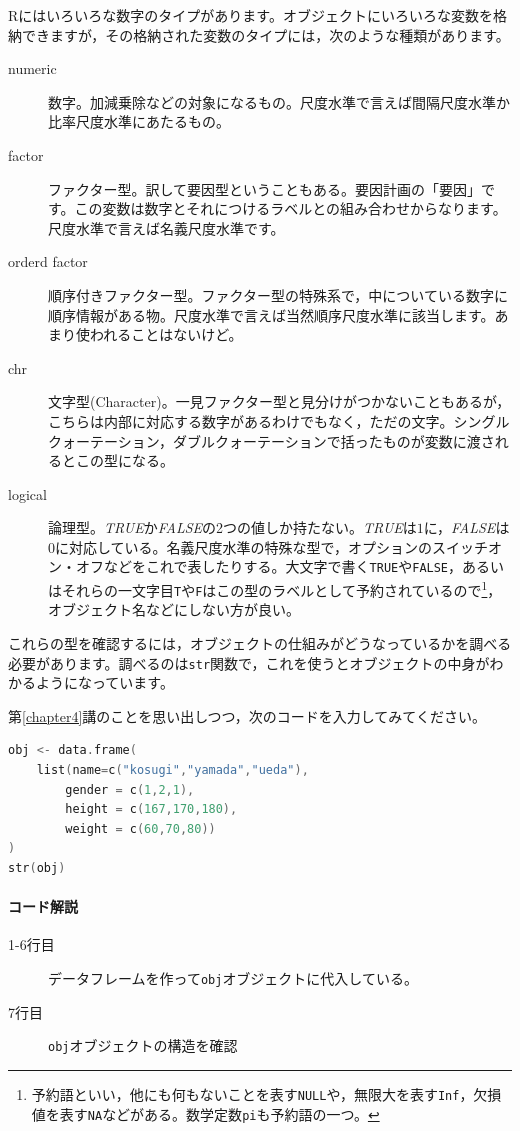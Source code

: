 \documentclass{ltjsarticle}
\begin{document}
Rにはいろいろな数字のタイプがあります。オブジェクトにいろいろな変数を格納できますが，その格納された変数のタイプには，次のような種類があります。
\begin{description}
    \item[numeric] 数字。加減乗除などの対象になるもの。尺度水準で言えば間隔尺度水準か比率尺度水準にあたるもの。
    \item[factor] ファクター型。訳して要因型ということもある。要因計画の「要因」です。この変数は数字とそれにつけるラベルとの組み合わせからなります。尺度水準で言えば名義尺度水準です。
    \item[orderd factor] 順序付きファクター型。ファクター型の特殊系で，中についている数字に順序情報がある物。尺度水準で言えば当然順序尺度水準に該当します。あまり使われることはないけど。
    \item[chr] 文字型(Character)。一見ファクター型と見分けがつかないこともあるが，こちらは内部に対応する数字があるわけでもなく，ただの文字。シングルクォーテーション，ダブルクォーテーションで括ったものが変数に渡されるとこの型になる。
    \item[logical] 論理型。\textit{TRUE}か\textit{FALSE}の2つの値しか持たない。\textit{TRUE}は$1$に，\textit{FALSE}は$0$に対応している。名義尺度水準の特殊な型で，オプションのスイッチオン・オフなどをこれで表したりする。大文字で書く\texttt{TRUE}や\texttt{FALSE}，あるいはそれらの一文字目\texttt{T}や\texttt{F}はこの型のラベルとして予約されているので\footnote{予約語といい，他にも何もないことを表す\texttt{NULL}や，無限大を表す\texttt{Inf}，欠損値を表す\texttt{NA}などがある。数学定数\texttt{pi}も予約語の一つ。}，オブジェクト名などにしない方が良い。
\end{description}
これらの型を確認するには，オブジェクトの仕組みがどうなっているかを調べる必要があります。調べるのは\texttt{str}関数で，これを使うとオブジェクトの中身がわかるようになっています。

第\ref{chapter4}講のことを思い出しつつ，次のコードを入力してみてください。
\begin{lstlisting}[language=c++]
obj <- data.frame(
    list(name=c("kosugi","yamada","ueda"),
        gender = c(1,2,1),
        height = c(167,170,180),
        weight = c(60,70,80))
)
str(obj)
\end{lstlisting}
\paragraph{コード解説}
\begin{description}
    \item[1-6行目] データフレームを作って\texttt{obj}オブジェクトに代入している。
    \item[7行目] \texttt{obj}オブジェクトの構造を確認
\end{description}
\end{document}
